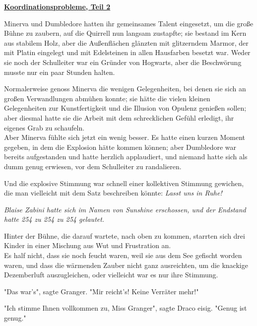 

\hypertarget{koordinationsprobleme-teil-2}{%

\textbf{\uline{Koordinationsprobleme, Teil 2}}

Minerva und Dumbledore hatten ihr gemeinsames Talent eingesetzt, um die große Bühne zu zaubern, auf die Quirrell nun langsam zustapfte; sie bestand im Kern aus stabilem Holz, aber die Außenflächen glänzten mit glitzerndem Marmor, der mit Platin eingelegt und mit Edelsteinen in allen Hausfarben besetzt war. Weder sie noch der Schulleiter war ein Gründer von Hogwarts, aber die Beschwörung musste nur ein paar Stunden halten.

Normalerweise genoss Minerva die wenigen Gelegenheiten, bei denen sie sich an großen Verwandlungen abmühen konnte; sie hätte die vielen kleinen Gelegenheiten zur Kunstfertigkeit und die Illusion von Opulenz genießen sollen; aber diesmal hatte sie die Arbeit mit dem schrecklichen Gefühl erledigt, ihr eigenes Grab zu schaufeln.\\ Aber Minerva fühlte sich jetzt ein wenig besser. Es hatte einen kurzen Moment gegeben, in dem die Explosion hätte kommen können; aber Dumbledore war bereits aufgestanden und hatte herzlich applaudiert, und niemand hatte sich als dumm genug erwiesen, vor dem Schulleiter zu randalieren.

Und die explosive Stimmung war schnell einer kollektiven Stimmung gewichen, die man vielleicht mit dem Satz beschreiben könnte: \emph{Lasst uns in Ruhe!}

\emph{Blaise Zabini hatte sich im Namen von Sunshine erschossen, und der Endstand hatte 254 zu 254 zu 254 gelautet.}

Hinter der Bühne, die darauf wartete, nach oben zu kommen, starrten sich drei Kinder in einer Mischung aus Wut und Frustration an.\\ Es half nicht, dass sie noch feucht waren, weil sie aus dem See gefischt worden waren, und dass die wärmenden Zauber nicht ganz ausreichten, um die knackige Dezemberluft auszugleichen, oder vielleicht war es nur ihre Stimmung.

"Das war's", sagte Granger. "Mir reicht's! Keine Verräter mehr!"

"Ich stimme Ihnen vollkommen zu, Miss Granger", sagte Draco eisig. "Genug ist genug."

}
